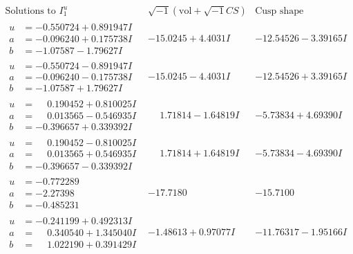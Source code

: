 \documentclass[1p]{elsarticle_modified}
\theoremstyle{definition}
\newcommand{\I}{\sqrt{-1}}
\begin{document}
$$\begin{array}{c|c|c}  
\text{Solutions to }I^u_{1}& \I (\text{vol} + \sqrt{-1}CS) & \text{Cusp shape}\\
 \hline 
\begin{aligned}
u &= -0.550724 + 0.891947 I \\
a &= -0.096240 + 0.175738 I \\
b &= -1.07587 - 1.79627 I\end{aligned}
 & -15.0245 + 4.4031 I & -12.54526 - 3.39165 I \\ \hline\begin{aligned}
u &= -0.550724 - 0.891947 I \\
a &= -0.096240 - 0.175738 I \\
b &= -1.07587 + 1.79627 I\end{aligned}
 & -15.0245 - 4.4031 I & -12.54526 + 3.39165 I \\ \hline\begin{aligned}
u &= \phantom{-}0.190452 + 0.810025 I \\
a &= \phantom{-}0.013565 - 0.546935 I \\
b &= -0.396657 + 0.339392 I\end{aligned}
 & \phantom{-}1.71814 - 1.64819 I & -5.73834 + 4.69390 I \\ \hline\begin{aligned}
u &= \phantom{-}0.190452 - 0.810025 I \\
a &= \phantom{-}0.013565 + 0.546935 I \\
b &= -0.396657 - 0.339392 I\end{aligned}
 & \phantom{-}1.71814 + 1.64819 I & -5.73834 - 4.69390 I \\ \hline\begin{aligned}
u &= -0.772289\phantom{ +0.000000I} \\
a &= -2.27398\phantom{ +0.000000I} \\
b &= -0.485231\phantom{ +0.000000I}\end{aligned}
 & -17.7180\phantom{ +0.000000I} & -15.7100\phantom{ +0.000000I} \\ \hline\begin{aligned}
u &= -0.241199 + 0.492313 I \\
a &= \phantom{-}0.340540 + 1.345040 I \\
b &= \phantom{-}1.022190 + 0.391429 I\end{aligned}
 & -1.48613 + 0.97077 I & -11.76317 - 1.95166 I \\ \hline\begin{aligned}

\end{aligned}
\end{array}$$
\end{document}
